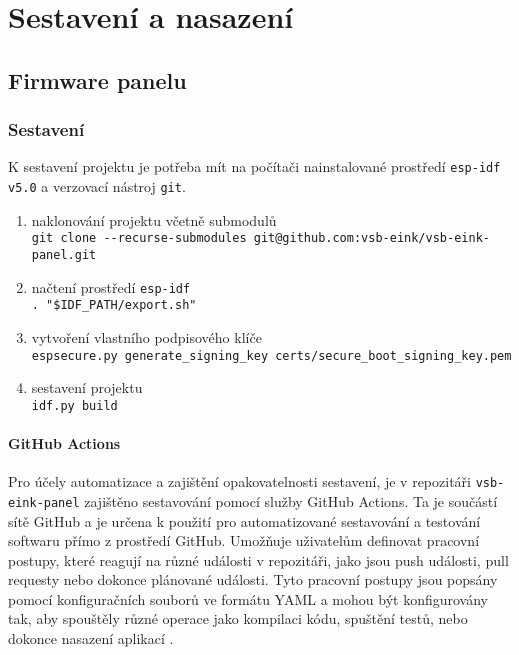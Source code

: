 \chapter{Sestavení a nasazení}

\section{Firmware panelu}
\subsection{Sestavení}
K sestavení projektu je potřeba mít na počítači nainstalované prostředí \lstinline|esp-idf v5.0| a verzovací nástroj \lstinline|git|.

\begin{enumerate}
    \item naklonování projektu včetně submodulů \\ \lstinline{git clone --recurse-submodules git@github.com:vsb-eink/vsb-eink-panel.git}
    \item načtení prostředí \lstinline|esp-idf| \\ \lstinline{. "$IDF_PATH/export.sh"}
    \item vytvoření vlastního podpisového klíče \\ \lstinline|espsecure.py generate_signing_key certs/secure_boot_signing_key.pem|
    \item sestavení projektu \\ \lstinline|idf.py build|
\end{enumerate}

\subsubsection*{GitHub Actions}
Pro účely automatizace a zajištění opakovatelnosti sestavení, je v repozitáři \lstinline|vsb-eink-panel| zajištěno sestavování pomocí služby GitHub Actions\cite{FeaturesGitHubActions2024}. Ta je součástí sítě GitHub a je určena k použití pro automatizované sestavování a testování softwaru přímo z prostředí GitHub. Umožňuje uživatelům definovat pracovní postupy, které reagují na různé události v repozitáři, jako jsou push události, pull requesty nebo dokonce plánované události. Tyto pracovní postupy jsou popsány pomocí konfiguračních souborů ve formátu YAML a mohou být konfigurovány tak, aby spouštěly různé operace jako kompilaci kódu, spuštění testů, nebo dokonce nasazení aplikací \cite{UnderstandingGitHubActions}.

